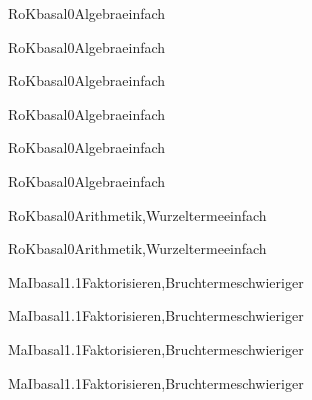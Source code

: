 \documentclass[12pt]{article}
\begin{document}
\begin{Add}{RoK}{basal0}{Algebra}{einfach}
\solution{ }
\end{Add}
\begin{Add}{RoK}{basal0}{Algebra}{einfach}
\end{Add}

\begin{Add}{RoK}{basal0}{Algebra}{einfach}
\solution{ }
\end{Add}
\begin{Add}{RoK}{basal0}{Algebra}{einfach}
\end{Add}

\begin{Add}{RoK}{basal0}{Algebra}{einfach}
\solution{ }
\end{Add}
\begin{Add}{RoK}{basal0}{Algebra}{einfach}
\end{Add}

\begin{Add}{RoK}{basal0}{Arithmetik,Wurzelterme}{einfach}
\solution{ }
\end{Add}
\begin{Add}{RoK}{basal0}{Arithmetik,Wurzelterme}{einfach}
\end{Add}

    \begin{Add}{MaI}{basal1.1}{Faktorisieren,Bruchterme}{schwieriger}
    \solution{ }
    \end{Add}
    \begin{Add}{MaI}{basal1.1}{Faktorisieren,Bruchterme}{schwieriger}
    \end{Add}
    

    \begin{Add}{MaI}{basal1.1}{Faktorisieren,Bruchterme}{schwieriger}
    \solution{ }
    \end{Add}
    \begin{Add}{MaI}{basal1.1}{Faktorisieren,Bruchterme}{schwieriger}
    \end{Add}
    
\end{document}
